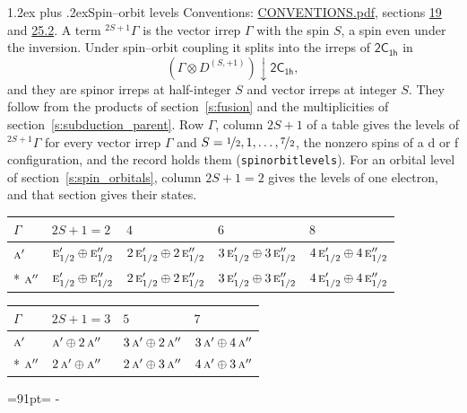\documentclass[10pt,a4paper]{article}
\makeatletter
\renewcommand\section{\@startsection{section}{1}{\z@}{-3ex plus -1ex minus -.2ex}%
  {1.2ex plus .2ex}{\normalfont\large\sffamily\bfseries\color{parttitle}}}
\newcommand{\needspace}[1]{\par\penalty-100\begingroup\dimen0=#1\relax\dimen2=\pagegoal
  \advance\dimen2-\pagetotal\ifdim\dimen0>\dimen2\relax\ifdim\dimen2>0pt\vfil\break\fi\fi
  \endgroup}
\numberwithin{equation}{section}
\newcommand{\grp}[1]{\mathsf{#1}}
\newcommand{\irr}[1]{\text{\normalfont\scshape #1}}
\newcommand{\restr}[2]{#1\!\downarrow#2}
\newcommand{\irrJp}[2]{D^{(#1,#2)}}
\newcommand{\irrprod}{\otimes}
\newcommand{\term}[2]{{}^{#1}#2}
\makeatother
\begin{document}
\section{Spin--orbit levels}\label{s:spin_orbit}
Conventions: \href{../../CONVENTIONS.pdf}{CONVENTIONS.pdf}, sections \href{../../../rotation/CONVENTIONS.pdf\#conv.19}{19} and \href{../../CONVENTIONS.pdf\#conv.25.2}{25.2}.
\leavevmode\label{n:local.spin}\label{n:symbol.term}A term $\term{2S+1}{\Gamma}$ is the vector irrep $\Gamma$ with the spin $S$, a spin even under the inversion. Under spin--orbit coupling it splits into the irreps of $\grp{2C_{1h}}$ in
\begin{equation}\label{e:spinorbit}\restr{(\Gamma \irrprod \irrJp{S}{+1})}{\grp{2C_{1h}}},\end{equation}
and they are spinor irreps at half-integer $S$ and vector irreps at integer $S$. They follow from the products of section~\ref{s:fusion} and the multiplicities of section~\ref{s:subduction_parent}. Row $\Gamma$, column $2S + 1$ of a table gives the levels of $\term{2S+1}{\Gamma}$ for every vector irrep $\Gamma$ and $S = \nicefrac{1}{2}, 1, \dots, \nicefrac{7}{2}$, the nonzero spins of a d or f configuration, and the record holds them (\texttt{spinorbitlevels}). For an orbital level of section~\ref{s:spin_orbitals}, column $2S + 1 = 2$ gives the levels of one electron, and that section gives their states.
{\small\setlength{\tabcolsep}{3pt}\begin{longtable}{@{}lllll@{}}\toprule
$\Gamma$ & $2S + 1 = 2$ & $4$ & $6$ & $8$\\\midrule\endhead
\bottomrule\endfoot\endlastfoot
$\irr{a}'$ & $\irr{e}_{1/2}'\oplus \irr{e}_{1/2}''$ & $2\,\irr{e}_{1/2}'\oplus 2\,\irr{e}_{1/2}''$ & $3\,\irr{e}_{1/2}'\oplus 3\,\irr{e}_{1/2}''$ & $4\,\irr{e}_{1/2}'\oplus 4\,\irr{e}_{1/2}''$\\*
$\irr{a}''$ & $\irr{e}_{1/2}'\oplus \irr{e}_{1/2}''$ & $2\,\irr{e}_{1/2}'\oplus 2\,\irr{e}_{1/2}''$ & $3\,\irr{e}_{1/2}'\oplus 3\,\irr{e}_{1/2}''$ & $4\,\irr{e}_{1/2}'\oplus 4\,\irr{e}_{1/2}''$\\
\bottomrule\end{longtable}}
{\small\setlength{\tabcolsep}{3pt}\begin{longtable}{@{}llll@{}}\toprule
$\Gamma$ & $2S + 1 = 3$ & $5$ & $7$\\\midrule\endhead
\bottomrule\endfoot\endlastfoot
$\irr{a}'$ & $\irr{a}'\oplus 2\,\irr{a}''$ & $3\,\irr{a}'\oplus 2\,\irr{a}''$ & $3\,\irr{a}'\oplus 4\,\irr{a}''$\\*
$\irr{a}''$ & $2\,\irr{a}'\oplus \irr{a}''$ & $2\,\irr{a}'\oplus 3\,\irr{a}''$ & $4\,\irr{a}'\oplus 3\,\irr{a}''$\\
\bottomrule\end{longtable}}
\needspace{91pt}
\end{document}
